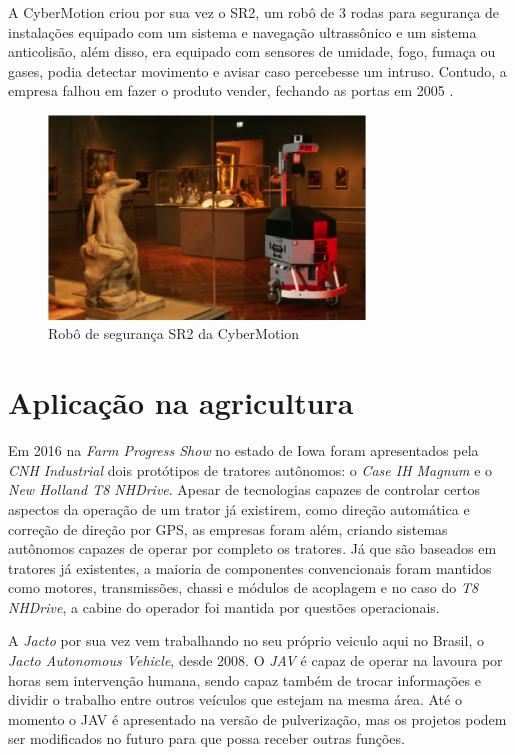 A CyberMotion criou por sua vez o SR2, um robô de 3 rodas para segurança de instalações equipado com um sistema e navegação ultrassônico e um sistema anticolisão, além disso, era equipado com sensores de umidade, fogo, fumaça ou gases, podia detectar movimento e avisar caso percebesse um intruso. Contudo, a empresa falhou em fazer o produto vender, fechando as portas em 2005 \cite{bracht:2015}.
\begin{figure}[H]
    \centering
    \includegraphics[width=0.75\textwidth]{figuras/cybermotion SR2.png}
    \caption{Robô de segurança SR2 da CyberMotion}
    \label{fig:cybermotion:sr2}
\end{figure}


\section{Aplicação na agricultura}
Em 2016 na \textit{Farm Progress Show} no estado de Iowa foram apresentados pela \textit{CNH Industrial} dois protótipos de tratores autônomos: o \textit{Case IH Magnum} e o \textit{New Holland T8 NHDrive}. Apesar de tecnologias capazes de controlar certos aspectos da operação de um trator já existirem, como direção automática e correção de direção por GPS, as empresas foram além, criando sistemas autônomos capazes de operar por completo os tratores. Já que são baseados em tratores já existentes, a maioria de componentes convencionais foram mantidos como motores, transmissões, chassi e módulos de acoplagem e no caso do \textit{T8 NHDrive}, a cabine do operador foi mantida por questões operacionais\cite{engineer:2016}.

A \textit{Jacto} por sua vez vem trabalhando no seu próprio veiculo aqui no Brasil, o \textit{Jacto Autonomous Vehicle}, desde 2008. O \textit{JAV} é capaz de operar na lavoura por horas sem intervenção humana, sendo capaz também de trocar informações e dividir o trabalho entre outros veículos que estejam na mesma área\cite{jacto:2018}. Até o momento o JAV é apresentado na versão de pulverização, mas os projetos podem ser modificados no futuro para que possa receber outras funções.

